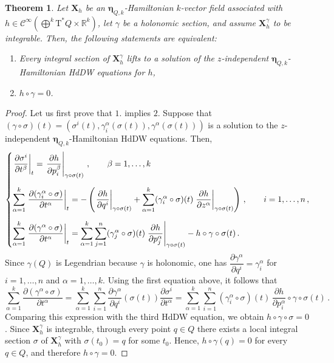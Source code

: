 \documentclass[11pt,twoside]{article}
\theoremstyle{plain}
\newtheorem{theorem}{Theorem}[section]
\theoremstyle{definition}
\theoremstyle{remark}
\newcommand{\Cinfty}{\mathscr{C}^\infty}
\newcommand{\cT}{\mathrm{T}^\ast}
\newcommand\restr[2]{\left.#1\right|_{#2}} \newcommand{\bfX}{\mathbf{X}} \newcommand{\bfY}{\mathbf{Y}} \newcommand{\bfZ}{\mathbf{Z}} \newcommand{\qeddiamond}{\hfill $\diamond$} \newcommand{\parder}[2]{\frac{\partial #1}{\partial #2}} \newcommand{\dparder}[2]{\dfrac{\partial #1}{\partial #2}} \newcommand{\tparder}[2]{\partial #1/\partial #2} \newcommand{\parderr}[3]{\frac{\partial^2 #1}{\partial #2\partial #3}} \newcommand{\dparderr}[3]{\dfrac{\partial^2 #1}{\partial #2\partial #3}} \newcommand{\tparderr}[3]{\partial^2 #1/\partial #2\partial #3}
\begin{document}
\begin{theorem}\label{theo:ClassicalHJzindependent}
Let $\mathbf{X}_h$ be an ${\bm \eta}_{Q,k}$-Hamiltonian $k$-vector field associated with $h\in\Cinfty(\bigoplus^k \cT Q \times \mathbb{R}^k)$, let $\gamma$ be a holonomic section, and assume $\mathbf{X}_h^\gamma$ to be integrable. Then, the following statements are equivalent:
\begin{enumerate}
\item Every integral section of $\mathbf{X}_h^\gamma$ lifts to a solution of the $z$-independent $\bm\eta_{Q,k}$-Hamiltonian HdDW equations for $h$,
\item $h\circ\gamma=0$.
\end{enumerate}
\end{theorem}

\begin{proof}
Let us first prove that \(1.\) implies \(2.\) Suppose that \((\gamma \circ \sigma)(t)=(\sigma^i(t),\gamma_i^\alpha(\sigma(t)),\gamma^\alpha(\sigma(t)))\) is a solution to the $z$-independent $\bm\eta_{Q,k}$-Hamiltonian HdDW equations. Then,
\[
\begin{dcases}
\restr{\dfrac{\partial \sigma^i}{\partial t^\beta}}{t}=\restr{\dfrac{\partial h}{\partial p_i^\beta}}{\gamma\circ \sigma(t)}\,,\qquad \beta=1,\dotsc,k  \\[2mm]
\sum_{\alpha=1}^k \restr{\dfrac{\partial(\gamma_i^\alpha\circ \sigma)}{\partial t^\alpha}}{t}
=
-\left(\restr{\dfrac{\partial h}{\partial q^i}}{\gamma\circ \sigma(t)}
+\sum_{\alpha=1}^k (\gamma_i^\alpha\circ \sigma)(t)\restr{\dfrac{\partial h}{\partial z^\alpha}}{\gamma\circ \sigma(t)}\right)\,,\qquad i=1,\dotsc,n\,,\\[2mm]
\sum_{\alpha=1}^k \restr{\dfrac{\partial(\gamma^\alpha\circ \sigma)}{\partial t^\alpha}}{t}
=
\sum_{\alpha=1}^k\sum_{j=1}^n (\gamma_j^\alpha\circ \sigma)(t)\restr{\dfrac{\partial h}{\partial p_j^\alpha}}{\gamma\circ \sigma(t)}
-h\circ \gamma\circ \sigma(t)\,.
\end{dcases}
\]
Since $\gamma(Q)$ is Legendrian because $\gamma$ is holonomic, one has \(\dfrac{\partial \gamma^\alpha}{\partial q^i}=\gamma_i^\alpha\) for \(i=1,\dotsc,n\) and \(\alpha=1,\dotsc,k\). Using the first equation above, it follows that
\[
\sum_{\alpha=1}^k \frac{\partial (\gamma^\alpha \circ \sigma)}{\partial t^\alpha}
=
\sum_{\alpha=1}^k \sum_{i=1}^n \frac{\partial \gamma^\alpha}{\partial q^i}(\sigma(t)) \frac{\partial \sigma^i}{\partial t^\alpha}
=
\sum_{\alpha=1}^k \sum_{i=1}^n (\gamma_i^\alpha\circ \sigma)(t)\,\frac{\partial h}{\partial p^\alpha_i}\circ \gamma \circ \sigma(t)\,.
\]
Comparing this expression with the third HdDW equation, we obtain \(h\circ \gamma\circ \sigma=0\). Since \(\mathbf{X}_h^\gamma\) is integrable, through every point \(q\in Q\) there exists a local integral section \(\sigma\) of \(\mathbf{X}_h^\gamma\) with \(\sigma(t_0)=q\) for some \(t_0\). Hence, \(h\circ \gamma(q)=0\) for every \(q\in Q\), and therefore \(h\circ \gamma=0\).


\end{proof}
\end{document}
